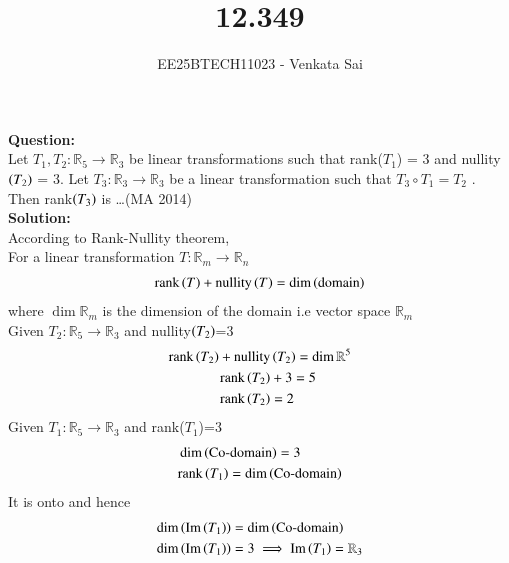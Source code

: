 \documentclass[journal]{IEEEtran}
\begin{document}


\title{12.349}
\author{EE25BTECH11023 - Venkata Sai}
\maketitle 
\renewcommand{\thefigure}{\theenumi}
\renewcommand{\thetable}{\theenumi}
\setlength{\intextsep}{10pt} %

\renewcommand{\thetable}{\theenumi}
\vspace{-1em}
\textbf{Question:}  \\
Let $T_1 , T_2 : \mathbb{R}_5 \rightarrow \mathbb{R}_3 $ be linear transformations such that rank($T_1$) = 3 and
nullity$\left(T_2\right)$ = 3. Let $T_3 : \mathbb{R}_3 \rightarrow \mathbb{R}_3$ be a linear transformation such that $T_3 \circ T_1 = T_2$ .
Then rank$\left(T_3\right)$ is \dots \hfill (MA 2014) \\
\textbf{Solution:}  \\
According to Rank-Nullity theorem,\\
For a linear transformation $T : \mathbb{R}_m \rightarrow \mathbb{R}_n $
\begin{align}
    \text{rank}\left(T\right)+\text{nullity}\left(T\right)=\dim\left(\text{domain}\right)
\end{align}
where $\dim\mathbb{R}_m $ is the dimension of the domain i.e vector space $\mathbb{R}_m $ \\ \newline
Given $T_2 : \mathbb{R}_5 \rightarrow \mathbb{R}_3 $ and nullity$\left(T_2\right)$=3 
\begin{align}
    \text{rank}\left(T_2\right)+\text{nullity}&\left(T_2\right)=\dim\mathbb{R}^5 \\
    \text{rank}\left(T_2\right)&+3=5 \\
    \text{rank}\left(T_2\right) &= 2
\end{align}
Given $T_1 : \mathbb{R}_5 \rightarrow \mathbb{R}_3 $ and rank($T_1$)=3
\begin{align}
    &\dim\left(\text{Co-domain}\right) =3 \\
    &\text{rank}\left(T_1\right)=\dim\left(\text{Co-domain}\right) 
\end{align}
It is onto and hence
\begin{align}
   \dim\left(\text{Im}\left(T_1\right)\right)&= \dim\left(\text{Co-domain}\right) \\
   \dim\left(\text{Im}\left(T_1\right)\right)&= 3 \implies \text{Im}\left(T_1\right)=\mathbb{R}_3
\end{align}
\end{document}
